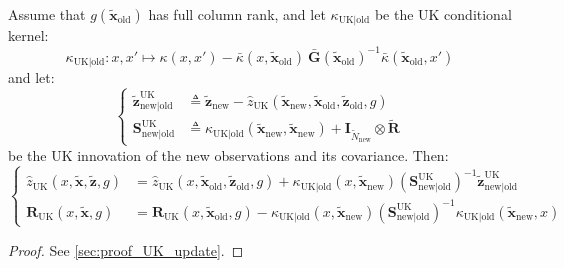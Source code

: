 \begin{proposition}\label{th:universal_kriging_update}
	Assume that $g(\tilde{\mathbf{x}}_{\mathrm{old}})$ has full column rank, and let $\kappa_{\mathrm{UK}|\mathrm{old}}$ be the UK conditional kernel:
	\begin{equation}
		\kappa_{\mathrm{UK}|\mathrm{old}}:x,x'\mapsto \kappa(x,x')-\bar{\kappa}(x,\tilde{\mathbf{x}}_{\mathrm{old}})\:\bar{\mathbf{G}}(\tilde{\mathbf{x}}_{\mathrm{old}})^{-1}\bar{\kappa}(\tilde{\mathbf{x}}_{\mathrm{old}},x')
	\end{equation}
	and let:
	\begin{equation}
		\left\{\begin{aligned}
		\tilde{\mathbf{z}}_{\mathrm{new}|\mathrm{old}}^{\mathrm{UK}}&\triangleq\tilde{\mathbf{z}}_{\mathrm{new}}-\hat{z}_{\mathrm{UK}}(\tilde{\mathbf{x}}_{\mathrm{new}},\tilde{\mathbf{x}}_{\mathrm{old}},\tilde{\mathbf{z}}_{\mathrm{old}},g)\\
		\mathbf{S}_{\mathrm{new}|\mathrm{old}}^{\mathrm{UK}}&\triangleq \kappa_{\mathrm{UK}|\mathrm{old}}(\tilde{\mathbf{x}}_{\mathrm{new}},\tilde{\mathbf{x}}_{\mathrm{new}})+\mathbf{I}_{\tilde{N}_{\mathrm{new}}}\otimes\tilde{\mathbf{R}}
		\end{aligned}\right.
	\end{equation}
	be the UK innovation of the new observations and its covariance. Then:
	\begin{equation}
		\left\{\begin{aligned}
		\hat{z}_{\mathrm{UK}}(x,\tilde{\mathbf{x}},\tilde{\mathbf{z}},g)&=\hat{z}_{\mathrm{UK}}(x,\tilde{\mathbf{x}}_{\mathrm{old}},\tilde{\mathbf{z}}_{\mathrm{old}},g)+\kappa_{\mathrm{UK}|\mathrm{old}}(x,\tilde{\mathbf{x}}_{\mathrm{new}})\left(\mathbf{S}_{\mathrm{new}|\mathrm{old}}^{\mathrm{UK}}\right)^{-1}\tilde{\mathbf{z}}_{\mathrm{new}|\mathrm{old}}^{\mathrm{UK}}\\
		\mathbf{R}_{\mathrm{UK}}(x,\tilde{\mathbf{x}},g)&=\mathbf{R}_{\mathrm{UK}}(x,\tilde{\mathbf{x}}_{\mathrm{old}},g)-\kappa_{\mathrm{UK}|\mathrm{old}}(x,\tilde{\mathbf{x}}_{\mathrm{new}})\left(\mathbf{S}_{\mathrm{new}|\mathrm{old}}^{\mathrm{UK}}\right)^{-1}\kappa_{\mathrm{UK}|\mathrm{old}}(\tilde{\mathbf{x}}_{\mathrm{new}},x)
		\end{aligned}\right.
	\end{equation}
\end{proposition}

\begin{proof}
	See \cref{sec:proof_UK_update}.
\end{proof}

